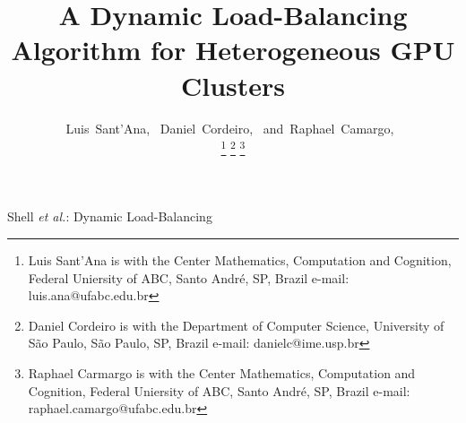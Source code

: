 \documentclass[journal]{IEEEtran}
\begin{document}
%
\title{A Dynamic Load-Balancing Algorithm for Heterogeneous GPU Clusters}
%
%
%

\author{Luis~Sant'Ana,~
        Daniel~Cordeiro,~
        and~Raphael~Camargo,~%

\thanks{Luis Sant'Ana is with the Center Mathematics, Computation and Cognition, Federal Uniersity of ABC, Santo Andr\'{e}, SP, Brazil e-mail: luis.ana@ufabc.edu.br}%
\thanks{Daniel Cordeiro is with the Department of Computer Science, University of S\~{a}o Paulo, S\~{a}o Paulo, SP, Brazil e-mail: danielc@ime.usp.br }%
\thanks{Raphael Carmargo is with the Center Mathematics, Computation and Cognition, Federal Uniersity of ABC, Santo Andr\'{e}, SP, Brazil e-mail: raphael.camargo@ufabc.edu.br}}

% 
%



%
{Shell \MakeLowercase{\textit{et al.}}:  Dynamic Load-Balancing}
% 
\end{document}
